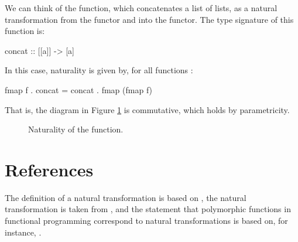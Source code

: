 \begin{example}
  \label{ex:natural-concat-haskell}

  We can think of the  function, which
  concatenates a list of lists, as a natural transformation from the
   functor and into the \texthaskell{[]} functor. The type
  signature of this function is:
  \begin{codehaskell}
concat :: [[a]] -> [a]
  \end{codehaskell}
  In this case, naturality is given by, for all functions
  :
  \begin{codehaskell}
fmap f . concat = concat . fmap (fmap f)
  \end{codehaskell}
  That is, the diagram in Figure \ref{fig:naturality-concat-haskell}
  is commutative, which holds by parametricity.

  \begin{figure}[htb]
    \begin{center}
    \end{center}
    \caption{Naturality of the  function.}
    \label{fig:naturality-concat-haskell}
  \end{figure}

\end{example}

\section{References}
\label{sec:naturals-references}

The definition of a natural transformation is based on
\parencites[16]{maclane-1998}[435--436]{poigne-1992}, the \nat{\eta}
natural transformation is taken from \parencite[11]{marquis-2013}, and
the statement that polymorphic functions in functional programming
correspond to natural transformations is based on, for instance,
\parencites[34]{bird-demoor-1997}[78]{elkins-2009}[435,
  436]{poigne-1992}[48,
  49]{rydeheard-1986}[113]{rydeheard-burstall-1988}[350]{wadler-1989}.

\clearemptydoublepage
